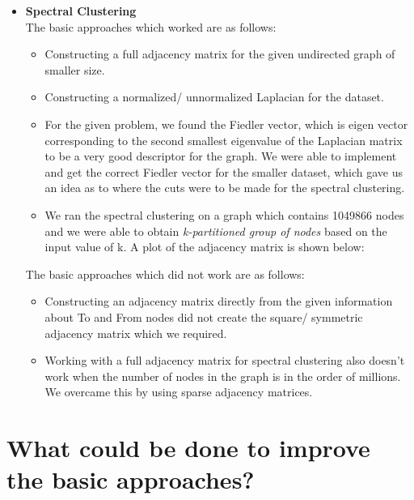 \documentclass[11pt]{exam}
\begin{document}
\begin{itemize}
\begin{itemize}
\end{itemize}

\item\textbf{Spectral Clustering}\\

The basic approaches which worked are as follows:
\begin{itemize}
	\item Constructing a full adjacency matrix for the given undirected graph of smaller size.
	\item Constructing a normalized/ unnormalized Laplacian for the dataset.
	\item For the given problem, we found the Fiedler vector, which is eigen vector corresponding to the second smallest eigenvalue of the Laplacian matrix to be a very good descriptor for the graph. We were able to implement and get the correct Fiedler vector for the smaller dataset, which gave us an idea as to where the cuts were to be made for the spectral clustering.
	\item We ran the spectral clustering on  a graph which contains 1049866 nodes and we were able to obtain \emph{k-partitioned group of nodes} based on the input value of k. A plot of the adjacency matrix is shown below:
\end{itemize}

The basic approaches which did not work are as follows:
\begin{itemize}
	\item Constructing an adjacency matrix directly from the given information about To and From nodes did not create the square/ symmetric adjacency matrix which we required.
	\item Working with a full adjacency matrix for spectral clustering also doesn't work when the number of nodes in the graph is in the order of millions. We overcame this by using sparse adjacency matrices.
\end{itemize}

\end{itemize}

\section{What could be done to improve the basic approaches?}
\end{document}
